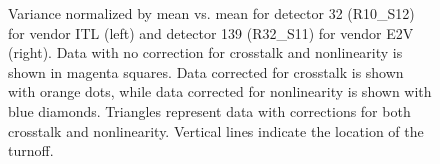 \begin{figure}[!htb]
\begin{subfigure}[b]{0.49\textwidth}
     \end{subfigure}
        \caption{Variance normalized by mean vs. mean for detector 32 (R10\_S12) for vendor ITL (left) and detector 139 (R32\_S11) for vendor E2V (right). Data with no correction for crosstalk and nonlinearity is shown in magenta squares. Data corrected for crosstalk is shown with orange dots, while data corrected for nonlinearity is shown with blue diamonds. Triangles represent data with corrections for both crosstalk and nonlinearity. Vertical lines indicate the location of the turnoff.}
        \label{fig:varmean_crosstalk}
\end{figure}